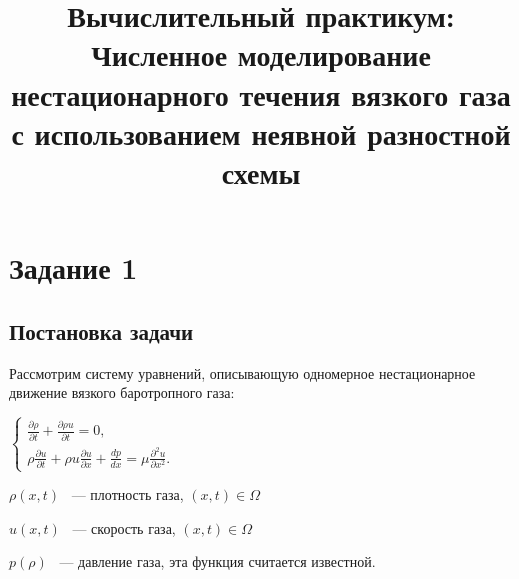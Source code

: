 \documentclass[12pt]{article}
\title{Вычислительный практикум: Численное моделирование нестационарного течения вязкого газа
с использованием неявной разностной схемы}
\begin{document}
\maketitle
\section{Задание 1}
\subsection{Постановка задачи}
Рассмотрим систему уравнений, описывающую одномерное нестационарное движение вязкого баротропного газа:

$
\begin{cases}
	\frac{\partial\rho}{\partial t} + \frac{\partial\rho u}{\partial t} = 0{,}\\
	\rho\frac{\partial u}{\partial t} + \rho u \frac{\partial u}{\partial x} + \frac{dp}{dx} = \mu \frac{\partial^2 u}{\partial x^2}{.}
\end{cases}
$

$\rho (x{,} t)$ ~--- плотность газа, $(x{,} t) \in \Omega$

 $u (x{,} t)$ ~--- скорость газа, $(x{,} t) \in \Omega$
 
 $p(\rho)$ ~--- давление газа, эта функция считается известной. 
\end{document}
